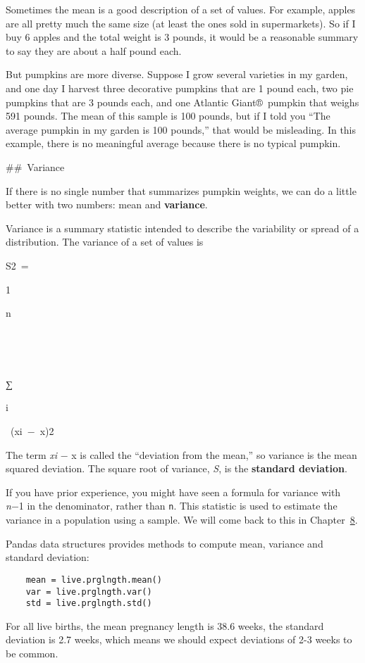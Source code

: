 \documentclass[]{book}
\begin{document}
Sometimes the mean is a good description
of a set of values. For example, apples are all pretty much the same
size (at least the ones sold in supermarkets). So if I buy 6 apples and
the total weight is 3 pounds, it would be a reasonable summary to say
they are about a half pound each.

But pumpkins are more diverse. Suppose I
grow several varieties in my garden, and one day I harvest three
decorative pumpkins that are 1 pound each, two pie pumpkins that are 3
pounds each, and one Atlantic Giant®~pumpkin that weighs 591 pounds. The
mean of this sample is 100 pounds, but if I told you ``The average
pumpkin in my garden is 100 pounds,'' that would be misleading. In this
example, there is no meaningful average because there is no typical
pumpkin.

\#\#~Variance

If there is no single number that
summarizes pumpkin weights, we can do a little better with two numbers:
mean and \textbf{variance}.

Variance is a summary statistic intended
to describe the variability or spread of a distribution. The variance of
a set of values is

{S}2~=~

1

{n}

~

~

{∑}

{i}

~({x}{i}~−~{x})2~

The term \emph{xi} − {x} is called the ``deviation from
the mean,'' so variance is the mean squared deviation. The square root of
variance, \emph{S}, is the \textbf{standard deviation}.

If you have prior experience, you might
have seen a formula for variance with \emph{n}−1 in the denominator, rather than
\texttt{n}. This statistic is used to
estimate the variance in a population using a sample. We will come back
to this in Chapter~\href{thinkstats2009.html\#estimation}{8}.

Pandas data structures provides methods
to compute mean, variance and standard deviation:

\begin{verbatim}
    mean = live.prglngth.mean()
    var = live.prglngth.var()
    std = live.prglngth.std()
\end{verbatim}

For all live births, the mean pregnancy
length is 38.6 weeks, the standard deviation is 2.7 weeks, which means
we should expect deviations of 2-3 weeks to be common.
\end{document}
